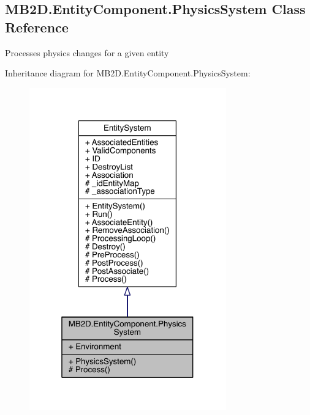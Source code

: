 \hypertarget{class_m_b2_d_1_1_entity_component_1_1_physics_system}{}\subsection{M\+B2\+D.\+Entity\+Component.\+Physics\+System Class Reference}
\label{class_m_b2_d_1_1_entity_component_1_1_physics_system}


Processes physics changes for a given entity  




Inheritance diagram for M\+B2\+D.\+Entity\+Component.\+Physics\+System\+:
\nopagebreak
\begin{figure}[H]
\begin{center}
\leavevmode
\includegraphics[width=241pt]{class_m_b2_d_1_1_entity_component_1_1_physics_system__inherit__graph}
\end{center}
\end{figure}


